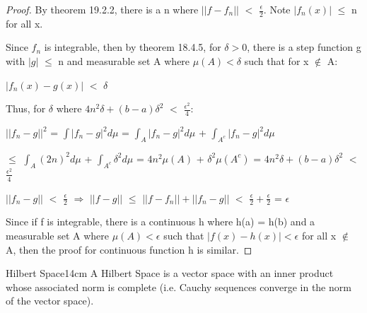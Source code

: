     \begin{proof}
        By {\color{red} theorem 19.2.2}, there is a n where
        $||f-f_n||$ $<$ $\frac{\epsilon}{2}$.
        Note $|f_n(x)|$ $\leq$ n for all x.

        Since $f_n$ is integrable, then by {\color{red} theorem 18.4.5},
        for $\delta > 0$, there is a step function g with $|g|$ $\leq$ n
        and measurable set A where $\mu(A) < \delta$ such that for x $\not \in$ A:

        \hspace{0.5cm}
        $|f_n(x) - g(x)|$ $<$ $\delta$

        Thus, for $\delta$ where
        $4n^2\delta +(b-a)\delta^2$ $<$ $\frac{\epsilon^2}{4}$:

        \hspace{0.5cm}
        $||f_n - g||^2$
        = $\int |f_n - g|^2 d\mu$
        = $\int_A |f_n - g|^2 d\mu$ + $\int_{A^c} |f_n - g|^2 d\mu$

        \hspace{2.4cm}
        $\leq$ $\int_A (2n)^2 d\mu$ + $\int_{A^c} \delta^2 d\mu$
        = $4n^2 \mu(A)$ + $\delta^2 \mu(A^c)$
        = $4n^2 \delta + (b-a)\delta^2$
        $<$ $\frac{\epsilon^2}{4}$

        \hspace{0.5cm}
        $||f_n - g||$ $<$ $\frac{\epsilon}{2}$
        \hspace{0.5cm}
        $\Rightarrow$
        \hspace{0.5cm}
        $||f-g||$
        $\leq$ $||f-f_n|| + ||f_n-g||$
        $<$ $\frac{\epsilon}{2} + \frac{\epsilon}{2}$
        = $\epsilon$

        Since if f is integrable, there is a continuous h where h(a) = h(b)
        and a measurable set A where $\mu(A) < \epsilon$
        such that $|f(x)-h(x)| < \epsilon$ for all x $\not \in$ A,
        then the proof for continuous function h is similar.
    \end{proof}

    \vspace{0.5cm}



    \begin{definition}{Hilbert Space}{14cm}
        A {\color{lblue} Hilbert Space}
        is a vector space with an inner product whose associated norm
        is complete
        (i.e. Cauchy sequences converge in the norm of the vector space).
    \end{definition}

